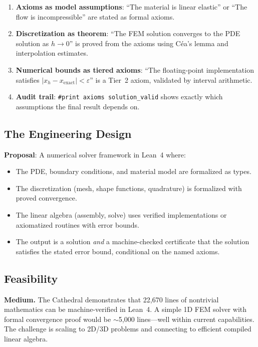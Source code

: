 \documentclass[11pt,a4paper]{article}
\begin{document}
\begin{enumerate}
  \item \textbf{Axioms as model assumptions}: ``The material is
    linear elastic'' or ``The flow is incompressible'' are stated
    as formal axioms.
  \item \textbf{Discretization as theorem}: ``The FEM solution
    converges to the PDE solution as $h \to 0$'' is proved from
    the axioms using C\'ea's lemma and interpolation estimates.
  \item \textbf{Numerical bounds as tiered axioms}: ``The
    floating-point implementation satisfies $|x_h - x_{\text{exact}}|
    < \varepsilon$'' is a Tier~2 axiom, validated by interval
    arithmetic.
  \item \textbf{Audit trail}: \texttt{\#print axioms solution\_valid}
    shows exactly which assumptions the final result depends on.
\end{enumerate}

\subsection{The Engineering Design}

\textbf{Proposal}: A numerical solver framework in Lean~4 where:
\begin{itemize}
  \item The PDE, boundary conditions, and material model are
    formalized as types.
  \item The discretization (mesh, shape functions, quadrature) is
    formalized with proved convergence.
  \item The linear algebra (assembly, solve) uses verified
    implementations or axiomatized routines with error bounds.
  \item The output is a solution \emph{and} a machine-checked
    certificate that the solution satisfies the stated error bound,
    conditional on the named axioms.
\end{itemize}

\subsection{Feasibility}

\textbf{Medium.} The Cathedral demonstrates that 22,670 lines of
nontrivial mathematics can be machine-verified in Lean~4. A simple
1D FEM solver with formal convergence proof would be $\sim$5,000
lines---well within current capabilities. The challenge is scaling
to 2D/3D problems and connecting to efficient compiled linear
algebra.
\end{document}
